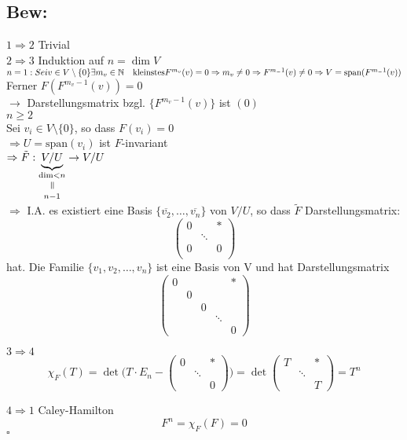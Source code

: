 \documentclass[titlepage,12pt,a4paper,ngerman]{report}
\newenvironment{bew}[1]{\subsection{Bew: #1}}{\hfill$\square$}
\newcommand{\Bew}[2]{\begin{bew}{#1}#2\end{bew}}
\newcommand{\verteq}{\rotatebox{90}{$\,=$}}
\newcommand{\equalto}[2]{\underset{\scriptstyle\overset{\mkern4mu\verteq}{#2}}{#1}}
\newcommand{\tx}[1]{\textrm{#1}}
\newcommand{\ov}[1]{\overline{#1}}
\newcommand{\ub}[1]{\underbrace{#1}}
\newcommand{\spa}{\tx{span}}
\begin{document}
\Bew{}{$\boxed{1 \Rightarrow 2}$ Trivial\\
	$\boxed{2 \Rightarrow 3}$ Induktion auf $n = \dim V$
	$n = 1: Sei v \in V\setminus \{0\} \\
	\exists m_v \in \mathbb{N} \quad \tx{kleinstes} \\
	F^{m_v}(v) = 0 \\
	\Rightarrow m_v \neq 0 \\
	\Rightarrow F^{m_ - 1}(v) \neq 0 \\
	\Rightarrow V= \tx{span}(F^{m_ - 1}(v))$
	\noindent Ferner $ F(F^{m_v-1} (v)) = 0$\\
	\indent $\rightarrow$ Darstellungsmatrix bzgl. $\{F^{m_v-1}(v)\}$ ist $(0)$\\
	$n\ge 2$\\
	Sei $v_i \in V\setminus\{0\}$, so dass $F(v_i) = 0$\\
	$\Rightarrow U = \spa (v_i)$ ist $F$-invariant\\
	$ \Rightarrow \tilde{F}: \ub{V/U}_{\equalto{\dim < n}{n-1}} \to V/U $\\
	$\Rightarrow$ I.A. es existiert eine Basis $\{\ov{v_2}, \dots , \ov{v_n}\}$ von $V/U$, so dass $\tilde{F}$ Darstellungsmatrix:$$\begin{pmatrix}
	0 & & *\\
	& \ddots \\
	0 & & 0\\
	\end{pmatrix}$$ hat.
	Die Familie $ \{v_1,v_2,\dots , v_n\} $ ist eine Basis von V und hat Darstellungsmatrix 
	$$ \begin{pmatrix}
	0 & & & & * \\
	& 0 \\
	& & 0 \\
	& & & \ddots \\
	& & & & 0
	\end{pmatrix} $$
	
	$\boxed{3 \Rightarrow 4}$ \\
	$$\chi_F(T) = \det \bigg( T \cdot E_n - \begin{pmatrix}
	0 & & *\\
	& \ddots \\
	& & 0
	\end{pmatrix} \bigg) = \det\begin{pmatrix}
	T & & * \\
	& \ddots \\
	& & T
	\end{pmatrix} = T^n$$
	
	$\boxed{4 \Rightarrow 1}$  Caley-Hamilton\\
	$$F^n = \chi_F(F) = 0$$
}
\end{document}
